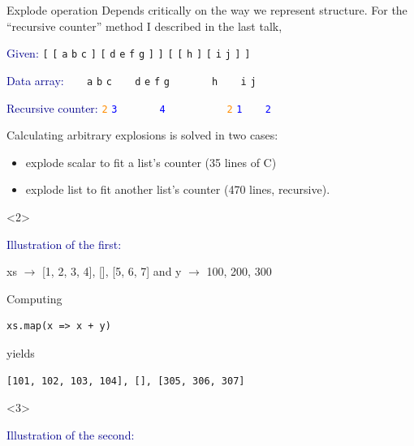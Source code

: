 \documentclass{beamer}
\begin{document}
\begin{frame}[fragile]{Explode operation}
\vspace{0.3 cm}
Depends critically on the way we represent structure. For the ``recursive counter'' method I described in the last talk,

\vspace{0.3 cm}
\textcolor{darkblue}{Given:} \hfill {\tt [} {\tt [} {\tt a} {\tt b} {\tt c} {\tt ]} {\tt [} {\tt d} {\tt e} {\tt f} {\tt g} {\tt ]} {\tt ]} {\tt [} {\tt [} {\tt h} {\tt ]} {\tt [} {\tt i} {\tt j} {\tt ]} {\tt ]}

\textcolor{darkblue}{Data array:} \hfill {\tt \ } {\tt \ } {\tt a} {\tt b} {\tt c} {\tt \ } {\tt \ } {\tt d} {\tt e} {\tt f} {\tt g} {\tt \ } {\tt \ } {\tt \ } {\tt \ } {\tt h} {\tt \ } {\tt \ } {\tt i} {\tt j} {\tt \ } {\tt \ }

\textcolor{darkblue}{Recursive counter:} \hfill \textcolor{darkorange}{\tt 2} \textcolor{blue}{\tt 3} {\tt \ } {\tt \ } {\tt \ } {\tt \ } \textcolor{blue}{\tt 4} {\tt \ } {\tt \ } {\tt \ } {\tt \ } {\tt \ } {\tt \ } \textcolor{darkorange}{\tt 2} \textcolor{blue}{\tt 1} {\tt \ } {\tt \ } \textcolor{blue}{\tt 2} {\tt \ } {\tt \ } {\tt \ } {\tt \ }

\vspace{0.3 cm}
Calculating arbitrary explosions is solved in two cases:
\begin{itemize}
\item explode scalar to fit a list's counter (35 lines of C)
\item explode list to fit another list's counter (470 lines, recursive).
\end{itemize}

\vspace{-0.3 cm}
\begin{onlyenv}<2>
\begin{center}
\begin{minipage}{0.8\linewidth}
\scriptsize
\vspace{0.3 cm}
\textcolor{darkblue}{Illustration of the first:}

\vspace{0.2 cm}
xs $\to$ [1, 2, 3, 4], [], [5, 6, 7] and y $\to$ 100, 200, 300

\vspace{0.2 cm}
Computing
\begin{verbatim}
xs.map(x => x + y)
\end{verbatim}

yields

\vspace{-0.4 cm}
\begin{verbatim}
[101, 102, 103, 104], [], [305, 306, 307]
\end{verbatim}
\end{minipage}
\end{center}
\end{onlyenv}
\begin{onlyenv}<3>
\begin{center}
\begin{minipage}{0.8\linewidth}
\scriptsize
\vspace{0.3 cm}
\textcolor{darkblue}{Illustration of the second:}


\end{minipage}
\end{center}
\end{onlyenv}
\end{frame}
\end{document}
